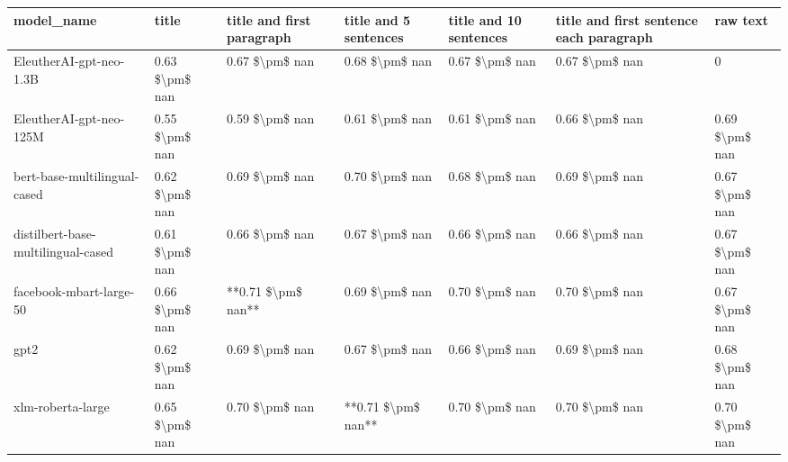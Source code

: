 \begin{tabular}{lllllll}
\toprule
                        model\_name &          title & title and first paragraph & title and 5 sentences & title and 10 sentences & title and first sentence each paragraph &       raw text \\
\midrule
           EleutherAI-gpt-neo-1.3B & 0.63 \$\textbackslash pm\$ nan &            0.67 \$\textbackslash pm\$ nan &        0.68 \$\textbackslash pm\$ nan &         0.67 \$\textbackslash pm\$ nan &                          0.67 \$\textbackslash pm\$ nan &              0 \\
           EleutherAI-gpt-neo-125M & 0.55 \$\textbackslash pm\$ nan &            0.59 \$\textbackslash pm\$ nan &        0.61 \$\textbackslash pm\$ nan &         0.61 \$\textbackslash pm\$ nan &                          0.66 \$\textbackslash pm\$ nan & 0.69 \$\textbackslash pm\$ nan \\
      bert-base-multilingual-cased & 0.62 \$\textbackslash pm\$ nan &            0.69 \$\textbackslash pm\$ nan &        0.70 \$\textbackslash pm\$ nan &         0.68 \$\textbackslash pm\$ nan &                          0.69 \$\textbackslash pm\$ nan & 0.67 \$\textbackslash pm\$ nan \\
distilbert-base-multilingual-cased & 0.61 \$\textbackslash pm\$ nan &            0.66 \$\textbackslash pm\$ nan &        0.67 \$\textbackslash pm\$ nan &         0.66 \$\textbackslash pm\$ nan &                          0.66 \$\textbackslash pm\$ nan & 0.67 \$\textbackslash pm\$ nan \\
           facebook-mbart-large-50 & 0.66 \$\textbackslash pm\$ nan &        **0.71 \$\textbackslash pm\$ nan** &        0.69 \$\textbackslash pm\$ nan &         0.70 \$\textbackslash pm\$ nan &                          0.70 \$\textbackslash pm\$ nan & 0.67 \$\textbackslash pm\$ nan \\
                              gpt2 & 0.62 \$\textbackslash pm\$ nan &            0.69 \$\textbackslash pm\$ nan &        0.67 \$\textbackslash pm\$ nan &         0.66 \$\textbackslash pm\$ nan &                          0.69 \$\textbackslash pm\$ nan & 0.68 \$\textbackslash pm\$ nan \\
                 xlm-roberta-large & 0.65 \$\textbackslash pm\$ nan &            0.70 \$\textbackslash pm\$ nan &    **0.71 \$\textbackslash pm\$ nan** &         0.70 \$\textbackslash pm\$ nan &                          0.70 \$\textbackslash pm\$ nan & 0.70 \$\textbackslash pm\$ nan \\
\bottomrule
\end{tabular}

